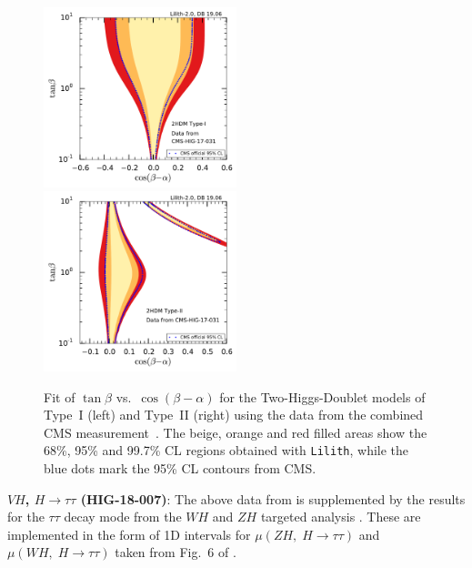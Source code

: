 \begin{figure}[t!]\centering
\includegraphics[width=0.5\textwidth]{validation/CMS/HIG-17-031-2HDM-Type1.pdf}%
\includegraphics[width=0.5\textwidth]{validation/CMS/HIG-17-031-2HDM-Type2.pdf}%
\vspace*{-2mm}
\caption{Fit of $\tan\beta$ vs.\ $\cos(\beta-\alpha)$ for the Two-Higgs-Doublet models of Type~I (left) and Type~II (right) 
using the data from the combined CMS measurement~\cite{Sirunyan:2018koj}. 
The beige, orange and red filled areas show the 68\%, 95\% and 99.7\% CL regions obtained with {\tt Lilith}, 
while the blue dots mark the 95\% CL contours from CMS.}
\label{fig:validation_cms_2hdm}
\end{figure}

{\bf\boldmath $VH$, $H\to\tau\tau$ (HIG-18-007)}: The above data from \cite{Sirunyan:2018koj} is supplemented by the results 
for the $\tau\tau$ decay mode from the $WH$ and $ZH$ targeted analysis \cite{Sirunyan:2018cpi}. These are implemented in the 
form of 1D intervals for $\mu(ZH,\;H\to\tau\tau)$ and $\mu(WH,\;H\to\tau\tau)$ taken from Fig.~6 of \cite{Sirunyan:2018cpi}. \\

